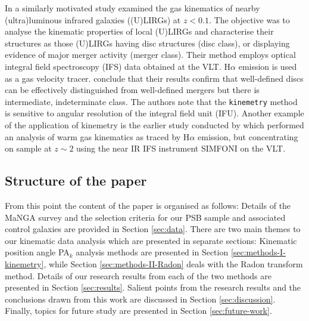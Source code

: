 In a similarly motivated study \citet{2016A&A...591A..85B} examined the gas kinematics of nearby (ultra)luminous infrared galaxies ((U)LIRGs) at $z<0.1$. The objective was to analyse the kinematic properties of local (U)LIRGs and characterise their structures as those (U)LIRGs having disc structures (disc class), or displaying evidence of major merger activity (merger class). Their method employs optical integral field spectroscopy (IFS) data obtained at the VLT. H$\alpha$ emission is used as a gas velocity tracer. \citet{2016A&A...591A..85B} conclude that their results confirm that well-defined discs can be effectively distinguished from well-defined mergers but there is intermediate, indeterminate class. The authors note that the \texttt{kinemetry} method is sensitive to angular resolution of the integral field unit (IFU). Another example of the application of kinemetry is the earlier study conducted by \citet{2008ApJ...682..231S} which performed an  analysis of warm gas kinematics as traced by H$\alpha$ emission, but concentrating on sample at $z\sim2$ using the near IR IFS instrument SIMFONI on the VLT.

\subsection{Structure of the paper}
From this point the content of the paper is organised as follows: Details of the MaNGA survey and the selection criteria for our PSB sample and associated control galaxies are provided in Section \ref{sec:data}. There are two main themes to our kinematic data analysis which are presented in separate sections: Kinematic position angle PA$_{k}$ analysis methods are presented in Section \ref{sec:methods-I-kinemetry}, while Section \ref{sec:methods-II-Radon} deals with the Radon transform method. Details of our research results from each of the two methods are presented in Section \ref{sec:results}. Salient points from the research results and the conclusions drawn from this work are discussed in Section \ref{sec:discussion}. Finally, topics for future study are presented in Section \ref{sec:future-work}.
